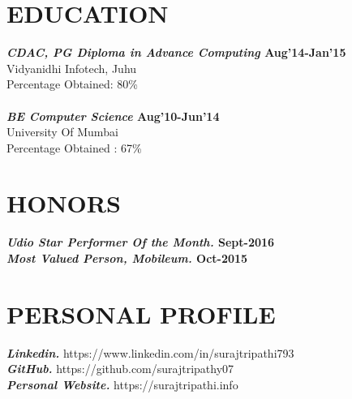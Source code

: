 \documentclass[line, margin]{res}
\begin{document}
\begin{resume}
\section{EDUCATION} 
\textbf{\textit{CDAC, PG Diploma in Advance Computing} \hfill Aug'14-Jan'15} \\
Vidyanidhi Infotech, Juhu \\
Percentage Obtained: 80\% \\
\\
\textbf{\textit{BE Computer Science} \hfill Aug'10-Jun'14} \\
University Of Mumbai \\
Percentage Obtained : 67\% \\
\section{HONORS}
\textbf{\textit{Udio Star Performer Of the Month.} \hfill Sept-2016} \\ 
\textbf{\textit{Most Valued Person, Mobileum.} \hfill Oct-2015} \\ 
\section{PERSONAL PROFILE}

\textbf{\textit{Linkedin.}} https://www.linkedin.com/in/surajtripathi793 \\
\textbf{\textit{GitHub.}} https://github.com/surajtripathy07  \\
\textbf{\textit{Personal Website.}} https://surajtripathi.info\\
\end{resume}
\end{document}
